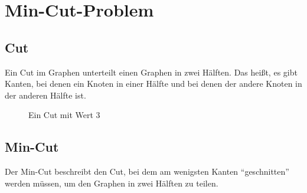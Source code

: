 \documentclass{scrartcl}%
\begin{document}

    \section*{Min-Cut-Problem}
    \label{sec:mincutproblem}

    \subsection*{Cut}
    \label{subsec:cut}

    Ein Cut im Graphen unterteilt einen Graphen in zwei Hälften.
    Das heißt, es gibt Kanten, bei denen ein Knoten in einer
    Hälfte und bei denen der andere Knoten in der anderen Hälfte ist.

    \begin{figure}[htb]
        \centering

        \caption*{Ein Cut mit Wert 3}
    \end{figure}

    \subsection*{Min-Cut}
    \label{subsec:mincut}
    Der Min-Cut beschreibt den Cut, bei dem am wenigsten Kanten "`geschnitten"' werden müssen,
    um den Graphen in zwei Hälften zu teilen.
\end{document}
